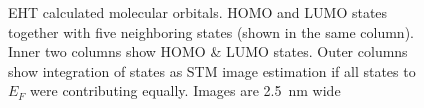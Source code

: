 \begin{figure}[h!]
{		\label{fig:}	
	}
	\caption{EHT calculated molecular orbitals. HOMO and LUMO states together with five neighboring states (shown in the same column). Inner two columns show HOMO \& LUMO states. Outer columns show integration of states as STM image estimation if all states to $E_F$ were contributing equally. Images are \SI{2.5}{\nano \meter} wide}
	\label{fig:}
\end{figure}
\vfill